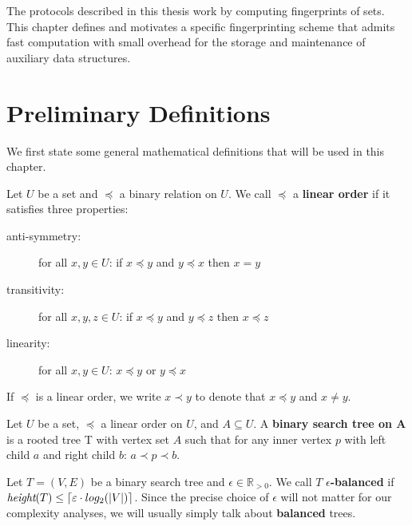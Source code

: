 
The protocols described in this thesis work by computing fingerprints of sets.
This chapter defines and motivates a specific fingerprinting scheme that admits fast computation with small overhead for the storage and maintenance of auxiliary data structures.

\section{Preliminary Definitions}

We first state some general mathematical definitions that will be used in this chapter.

\begin{definition}
Let $U$ be a set and $\preceq$ a binary relation on $U$.
We call $\preceq$ a \textbf{linear order} if it satisfies three properties:

  \begin{description}
    \item[anti-symmetry:] for all $x, y \in U$: if $x \preceq y$ and $y \preceq x$ then $x = y$
    \item[transitivity:] for all $x, y, z \in U$: if $x \preceq y$ and $y \preceq z$ then $x \preceq z$
    \item[linearity:] for all $x, y \in U$: $x \preceq y$ or $y \preceq x$
  \end{description}

If $\preceq$ is a linear order, we write $x \prec y$ to denote that $x \preceq y$ and $x \neq y$.
\end{definition}

\begin{definition}
Let $U$ be a set, $\preceq$ a linear order on $U$, and $A \subseteq U$.
A \textbf{binary search tree on A} is a rooted tree T with vertex set $A$ such that for any inner vertex $p$ with left child $a$ and right child $b$: $a \prec p \prec b$.
\end{definition}

\begin{definition}
Let $T = (V, E)$ be a binary search tree and $\epsilon \in \mathbb{R}_{> 0}$.
We call $T$ \textbf{$\epsilon$-balanced} if $\textit{height}(T) \leq \ceil*{\epsilon \cdot log_2(|V|)}$.
Since the precise choice of $\epsilon$ will not matter for our complexity analyses, we will usually simply talk about \textbf{balanced} trees.
\end{definition}

